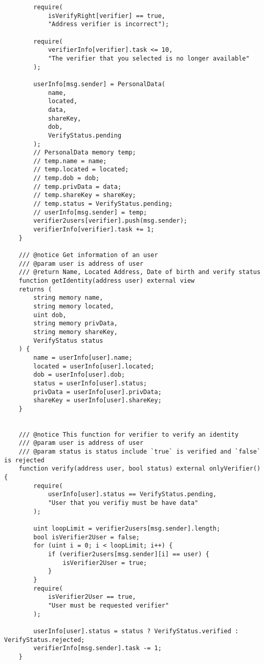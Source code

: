 \documentclass[../main-report.tex]{subfiles}
\begin{document}
\begin{lstlisting}
        require(
            isVerifyRight[verifier] == true,
            "Address verifier is incorrect");
        
        require(
            verifierInfo[verifier].task <= 10,
            "The verifier that you selected is no longer available"
        );

        userInfo[msg.sender] = PersonalData(
            name,
            located,
            data,
            shareKey,
            dob,
            VerifyStatus.pending
        );
        // PersonalData memory temp;
        // temp.name = name;
        // temp.located = located;
        // temp.dob = dob;
        // temp.privData = data;
        // temp.shareKey = shareKey;
        // temp.status = VerifyStatus.pending;
        // userInfo[msg.sender] = temp;
        verifier2users[verifier].push(msg.sender);
        verifierInfo[verifier].task += 1;
    }

    /// @notice Get information of an user
    /// @param user is address of user
    /// @return Name, Located Address, Date of birth and verify status
    function getIdentity(address user) external view
    returns (
        string memory name,
        string memory located,
        uint dob,
        string memory privData,
        string memory shareKey,
        VerifyStatus status
    ) {
        name = userInfo[user].name;
        located = userInfo[user].located;
        dob = userInfo[user].dob;
        status = userInfo[user].status;
        privData = userInfo[user].privData;
        shareKey = userInfo[user].shareKey;
    }


    /// @notice This function for verifier to verify an identity
    /// @param user is address of user
    /// @param status is status include `true` is verified and `false` is rejected
    function verify(address user, bool status) external onlyVerifier() {
        require(
            userInfo[user].status == VerifyStatus.pending,
            "User that you verifiy must be have data"
        );

        uint loopLimit = verifier2users[msg.sender].length;
        bool isVerifier2User = false;
        for (uint i = 0; i < loopLimit; i++) {
            if (verifier2users[msg.sender][i] == user) {
                isVerifier2User = true;
            }
        }
        require(
            isVerifier2User == true,
            "User must be requested verifier"
        );

        userInfo[user].status = status ? VerifyStatus.verified : VerifyStatus.rejected;
        verifierInfo[msg.sender].task -= 1;
    }


\end{lstlisting}
\end{document}
